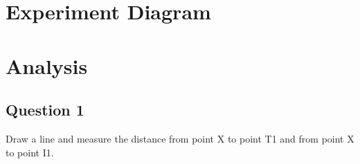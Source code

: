\documentclass[12pt]{article}
\begin{document}
\pagebreak

\section{Experiment Diagram}

\begin{figure}[H]
\centering
{}
\end{figure}

\pagebreak

\section{Analysis}
\subsection{Question 1}
Draw a line and measure the distance from point X to point T1 and from point X to point I1. 
\end{document}
